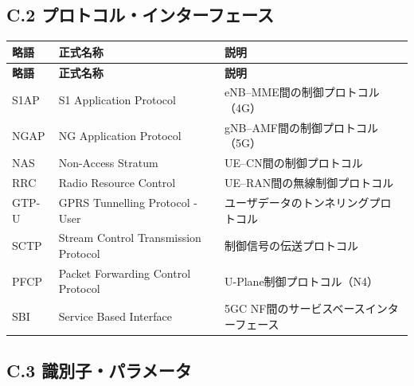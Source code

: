\subsection*{C.2 プロトコル・インターフェース}

\begin{longtable}{|p{1.8cm}|p{4.5cm}|p{6.5cm}|}
\hline
\textbf{略語} & \textbf{正式名称} & \textbf{説明} \\
\hline
\endfirsthead
\hline
\textbf{略語} & \textbf{正式名称} & \textbf{説明} \\
\hline
\endhead
\hline
\endfoot
S1AP & S1 Application Protocol & eNB--MME間の制御プロトコル（4G） \\
\hline
NGAP & NG Application Protocol & gNB--AMF間の制御プロトコル（5G） \\
\hline
NAS & Non-Access Stratum & UE--CN間の制御プロトコル \\
\hline
RRC & Radio Resource Control & UE--RAN間の無線制御プロトコル \\
\hline
GTP-U & GPRS Tunnelling Protocol - User & ユーザデータのトンネリングプロトコル \\
\hline
SCTP & Stream Control Transmission Protocol & 制御信号の伝送プロトコル \\
\hline
PFCP & Packet Forwarding Control Protocol & U-Plane制御プロトコル（N4） \\
\hline
SBI & Service Based Interface & 5GC NF間のサービスベースインターフェース \\
\hline
\end{longtable}

\subsection*{C.3 識別子・パラメータ}

